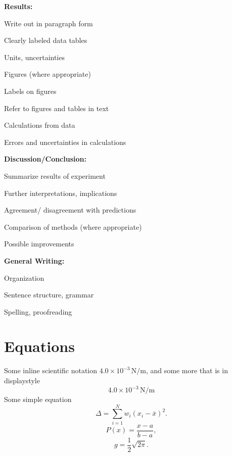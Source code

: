 \documentclass[
    10pt,aps,prl,
    amsfonts,
    amssymb,
    amsmath,
    draft,
    runinaddress,
    secnum,
    showkeys,
    superscriptaddress,
    twocolumn,
]{revtex4}
\begin{document}
    \textbf{Results:}
    \begin{itemize*}[label=\square]
        \item Write out in paragraph form
        \item Clearly labeled data tables
        \item Units, uncertainties
        \item Figures (where appropriate)
        \item Labels on figures
        \item Refer to figures and tables in text
        \item Calculations from data
        \item Errors and uncertainties in calculations
    \end{itemize*}

    \textbf{Discussion/Conclusion:}
    \begin{itemize*}[label=\square]
        \item Summarize results of experiment
        \item Further interpretations, implications
        \item Agreement/ disagreement with predictions
        \item Comparison of methods (where appropriate)
        \item Possible improvements
    \end{itemize*}

    \textbf{General Writing:}
    \begin{itemize*}[label=\square]
        \item Organization
        \item Sentence structure, grammar
        \item Spelling, proofreading
    \end{itemize*}



\section{Equations}
Some inline scientific notation $4.0\times 10^{-3}\,\mathrm{N/m}$,
    and some more that is in displaystyle
\begin{equation}
    4.0\times 10^{-3}\,\mathrm{N/m}
\end{equation}
Some simple equation
\begin{equation}
    \Delta =\sum_{i=1}^N w_i (x_i - \bar{x})^2.
\end{equation}
\begin{equation}
    P(x) = \frac{x - a}{b - a}, \nonumber
\end{equation}
\begin{equation}
    g = \frac{1}{2} \sqrt{2\pi}. \nonumber
\end{equation}
\end{document}
